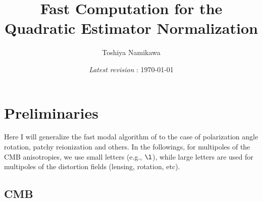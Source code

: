 \documentclass{article}
\begin{document}
\title{Fast Computation for the Quadratic Estimator Normalization}

\author{Toshiya Namikawa}

\date{{\it Latest revision} : \today}


\maketitle

\tableofcontents


\section{Preliminaries} 

Here I will generalize the fast modal algorithm of \cite{Dvorkin:2009ah,Smith:2010gu} 
to the case of polarization angle rotation, patchy reionization and others. 
In the followings, for multipoles of the CMB anisotropies, we use small letters (e.g., $\l$), 
while large letters are used for multipoles of the distortion fields (lensing, rotation, etc). 

\subsection{CMB} 
\end{document}

